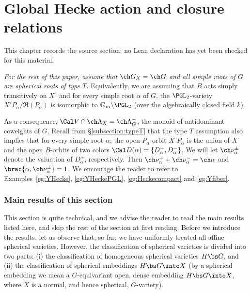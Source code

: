 \chapter{Global Hecke action and closure relations}
\label{intersection-complexes-unramified-l-factors-chapter-05}

\begin{remark}
\label{intersection-complexes-unramified-l-factors-chapter-05-source}
This chapter records the source section; no Lean declaration has yet been checked for this material.
\notready
\end{remark}

\label{sect:Heckeact}


\emph{For the rest of this paper, assume that $\ch G_X = \ch G$
and all simple roots of $G$ are spherical roots of type $T$.} Equivalently,
we are assuming that $B$ acts simply transitively on $X^\circ$ and
for every simple root $\alpha$ of $G$, the $\PGL_2$-variety $X^\circ P_\alpha/\mathfrak R(P_\alpha)$ is isomorphic to $\mathbb G_m\backslash\PGL_2$ (over the algebraically closed field $k$).



As a consequence, $\Cal V \cap \ch\Lambda_X = \ch\Lambda^-_G$, the monoid of antidominant coweights of $G$.
Recall from \S\ref{subsection:typeT} that
the type $T$ assumption also implies that for every simple root $\alpha$,
the open $P_\alpha$-orbit
$X^\circ P_\alpha$ is the union of $X^\circ$ and the open $B$-orbits of
two colors $\Cal D(\alpha) = \{ D_\alpha^+,D_\alpha^- \}$.
We will let $\ch\nu_\alpha^\pm$ denote the valuation of $D_\alpha^\pm$, respectively.
Then $\ch\nu_\alpha^+ + \ch\nu_\alpha^- = \ch\alpha$
and $\brac{\alpha, \ch\nu_\alpha^\pm} = 1$.
We encourage the reader to refer to Examples~\ref{eg:YHecke}, \ref{eg:YHeckePGL}, \ref{eg:Heckecompact} and \ref{eg:Yfiber}.

\subsection{Main results of this section}

This section is quite technical, and we advise the reader to read the main results listed here, and skip the rest of the section at first reading. Before we introduce the results, let us observe that, so far, we have uniformly treated all affine spherical varieties.
However, the classification of spherical varieties is divided into two parts:
(i) the classification of homogeneous spherical varieties $H\bs G$, and (ii) the
classification of spherical embeddings $H\bs G \into X$ (by a spherical embedding we mean a $G$-equivariant open, dense embedding $H\bs G \into X$, where $X$ is a normal, and hence spherical, $G$-variety).

